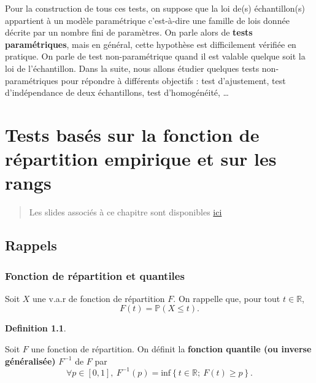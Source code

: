\documentclass[
]{book}
\theoremstyle{definition}
\newtheorem{definition}{Definition}[chapter]
\theoremstyle{definition}
\theoremstyle{definition}
\theoremstyle{definition}
\theoremstyle{remark}
\begin{document}
Pour la construction de tous ces tests, on suppose que la loi de(s) échantillon(s) appartient à un modèle paramétrique c'est-à-dire une famille de lois donnée décrite par un nombre fini de paramètres. On parle alors de \textbf{tests paramétriques}, mais en général, cette hypothèse est difficilement vérifiée en pratique. On parle de test non-paramétrique quand il est valable quelque soit la loi de l'échantillon.
Dans la suite, nous allons étudier quelques tests non-paramétriques pour répondre à différents objectifs : test d'ajustement, test d'indépendance de deux échantillons, test d'homogénéité, \ldots{}

\hypertarget{tests-basuxe9s-sur-la-fonction-de-ruxe9partition-empirique-et-sur-les-rangs}{%
\chapter{Tests basés sur la fonction de répartition empirique et sur les rangs}\label{tests-basuxe9s-sur-la-fonction-de-ruxe9partition-empirique-et-sur-les-rangs}}

\begin{quote}
Les slides associés à ce chapitre sont disponibles \href{image/SlidesTestsPart1.pdf}{ici}
\end{quote}

\hypertarget{rappels}{%
\section{Rappels}\label{rappels}}

\hypertarget{fonction-de-ruxe9partition-et-quantiles}{%
\subsection{Fonction de répartition et quantiles}\label{fonction-de-ruxe9partition-et-quantiles}}

Soit \(X\) une v.a.r de fonction de répartition \(F\). On rappelle que, pour tout \(t\in \mathbb{R}\),
\[
F(t) = \mathbb{P}(X\leq t).
\]

\begin{definition}
\protect\hypertarget{def:unlabeled-div-10}{}\label{def:unlabeled-div-10}

Soit \(F\) une fonction de répartition. On définit la \textbf{fonction quantile (ou inverse généralisée)} \(F^{-1}\) de \(F\) par
\[
\forall p \in [0,1],\ F^{-1}(p) = \mbox{inf} \left\{t\in \mathbb{R};\ F(t) \geq p  \right\}.
\]

\end{definition}
\end{document}
